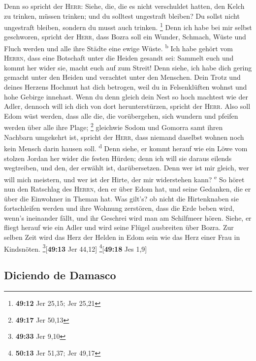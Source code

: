  Denn so spricht der \textsc{Herr}: Siehe, die, die es
nicht verschuldet hatten, den Kelch zu trinken, müssen trinken; und du
solltest ungestraft bleiben? Du sollst nicht ungestraft bleiben, sondern
du musst auch trinken. \footnote{\textbf{49:12} Jer 25,15; Jer 25,21}
 Denn ich habe bei mir selbst geschworen, spricht der
\textsc{Herr}, dass Bozra soll ein Wunder, Schmach, Wüste und Fluch
werden und alle ihre Städte eine ewige Wüste. \textsuperscript{b}
 Ich habe gehört vom \textsc{Herrn}, dass eine Botschaft
unter die Heiden gesandt sei: Sammelt euch und kommt her wider sie,
macht euch auf zum Streit!  Denn siehe, ich habe dich
gering gemacht unter den Heiden und verachtet unter den Menschen.
 Dein Trotz und deines Herzens Hochmut hat dich betrogen,
weil du in Felsenklüften wohnst und hohe Gebirge innehast. Wenn du denn
gleich dein Nest so hoch machtest wie der Adler, dennoch will ich dich
von dort herunterstürzen, spricht der \textsc{Herr}. 
Also soll Edom wüst werden, dass alle die, die vorübergehen, sich
wundern und pfeifen werden über alle ihre Plage; \footnote{\textbf{49:17}
  Jer 50,13}  gleichwie Sodom und Gomorra samt ihren
Nachbarn umgekehrt ist, spricht der \textsc{Herr}, dass niemand daselbst
wohnen noch kein Mensch darin hausen soll. \textsuperscript{d}
 Denn siehe, er kommt herauf wie ein Löwe vom stolzen
Jordan her wider die festen Hürden; denn ich will sie daraus eilends
wegtreiben, und den, der erwählt ist, darübersetzen. Denn wer ist mir
gleich, wer will mich meistern, und wer ist der Hirte, der mir
widerstehen kann? \textsuperscript{e}  So höret nun den
Ratschlag des \textsc{Herrn}, den er über Edom hat, und seine Gedanken,
die er über die Einwohner in Theman hat. Was gilt's? ob nicht die
Hirtenknaben sie fortschleifen werden und ihre Wohnung zerstören,
 dass die Erde beben wird, wenn's ineinander fällt, und
ihr Geschrei wird man am Schilfmeer hören.  Siehe, er
fliegt herauf wie ein Adler und wird seine Flügel ausbreiten über Bozra.
Zur selben Zeit wird das Herz der Helden in Edom sein wie das Herz einer
Frau in Kindsnöten. \footnote{\textbf{49:33} Jer 9,10}{[}\textbf{49:13}
Jer 44,12{]} \footnote{\textbf{50:13} Jer 51,37; Jer 49,17}{[}\textbf{49:18}
Jes 1,9{]}

\hypertarget{diciendo-de-damasco}{%
\subsection{Diciendo de Damasco}\label{diciendo-de-damasco}}


